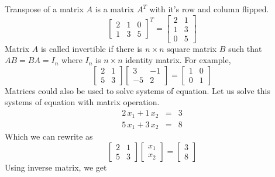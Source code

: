 \noindent Transpose of a matrix $A$ is a matrix $A^T$ with it's row and column flipped.
\begin{equation}
\begin{bmatrix}
	2&1  &0  \\
	1& 3 &5 
\end{bmatrix}^T=
\begin{bmatrix}
	2& 1 \\
	1& 3 \\
	0&5
\end{bmatrix}
\end{equation}
\noindent Matrix $A$ is called invertible if there is $n\times n$ square matrix $B$ such that $AB=BA=I_n$ where $I_n$ is $n\times n$ identity matrix. For example,
\begin{equation}
	\begin{bmatrix}
		2&1   \\
		5& 3 
	\end{bmatrix}
	\begin{bmatrix}
		3& -1 \\
		-5& 2 
	\end{bmatrix}=
	\begin{bmatrix}
		1& 0 \\
		0& 1 
	\end{bmatrix}
\end{equation}
\noindent Matrices could also be used to solve systems of equation. Let us solve this systems of equation with matrix operation.
\begin{equation}
\begin{aligned}
	2\, x_1 + 1\, x_2 &=& 3\\
	5\, x_1 + 3\, x_2 &=& 8
\end{aligned}
\end{equation}
\noindent Which we can rewrite as
\begin{equation}
\begin{bmatrix}
	2&1\\
	5&3
\end{bmatrix}
\begin{bmatrix}
	x_1\\
	x_2 
\end{bmatrix}
=
\begin{bmatrix}
	3\\
	8 
\end{bmatrix}
\end{equation}
\noindent Using inverse matrix, we get
